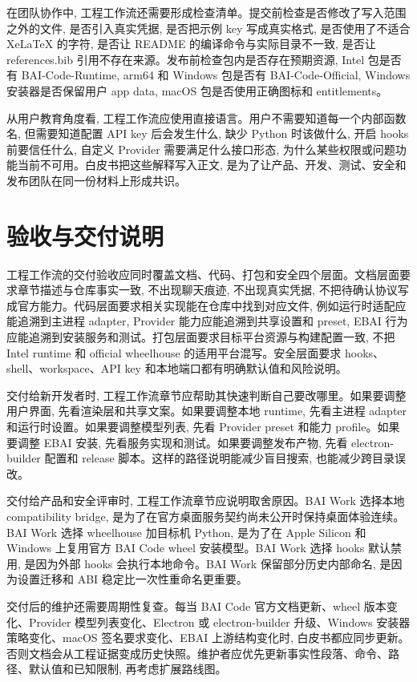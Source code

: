 在团队协作中, 工程工作流还需要形成检查清单。提交前检查是否修改了写入范围之外的文件, 是否引入真实凭据, 是否把示例 key 写成真实格式, 是否使用了不适合 XeLaTeX 的字符, 是否让 README 的编译命令与实际目录不一致, 是否让 references.bib 引用不存在来源。发布前检查包内是否存在预期资源, Intel 包是否有 BAI-Code-Runtime, arm64 和 Windows 包是否有 BAI-Code-Official, Windows 安装器是否保留用户 app data, macOS 包是否使用正确图标和 entitlements。

从用户教育角度看, 工程工作流应使用直接语言。用户不需要知道每一个内部函数名, 但需要知道配置 API key 后会发生什么, 缺少 Python 时该做什么, 开启 hooks 前要信任什么, 自定义 Provider 需要满足什么接口形态, 为什么某些权限或问题功能当前不可用。白皮书把这些解释写入正文, 是为了让产品、开发、测试、安全和发布团队在同一份材料上形成共识。

\section{验收与交付说明}
工程工作流的交付验收应同时覆盖文档、代码、打包和安全四个层面。文档层面要求章节描述与仓库事实一致, 不出现聊天痕迹, 不出现真实凭据, 不把待确认协议写成官方能力。代码层面要求相关实现能在仓库中找到对应文件, 例如运行时适配应能追溯到主进程 adapter, Provider 能力应能追溯到共享设置和 preset, EBAI 行为应能追溯到安装服务和测试。打包层面要求目标平台资源与构建配置一致, 不把 Intel runtime 和 official wheelhouse 的适用平台混写。安全层面要求 hooks、shell、workspace、API key 和本地端口都有明确默认值和风险说明。

交付给新开发者时, 工程工作流章节应帮助其快速判断自己要改哪里。如果要调整用户界面, 先看渲染层和共享文案。如果要调整本地 runtime, 先看主进程 adapter 和运行时设置。如果要调整模型列表, 先看 Provider preset 和能力 profile。如果要调整 EBAI 安装, 先看服务实现和测试。如果要调整发布产物, 先看 electron-builder 配置和 release 脚本。这样的路径说明能减少盲目搜索, 也能减少跨目录误改。

交付给产品和安全评审时, 工程工作流章节应说明取舍原因。BAI Work 选择本地 compatibility bridge, 是为了在官方桌面服务契约尚未公开时保持桌面体验连续。BAI Work 选择 wheelhouse 加目标机 Python, 是为了在 Apple Silicon 和 Windows 上复用官方 BAI Code wheel 安装模型。BAI Work 选择 hooks 默认禁用, 是因为外部 hooks 会执行本地命令。BAI Work 保留部分历史内部命名, 是因为设置迁移和 ABI 稳定比一次性重命名更重要。

交付后的维护还需要周期性复查。每当 BAI Code 官方文档更新、wheel 版本变化、Provider 模型列表变化、Electron 或 electron-builder 升级、Windows 安装器策略变化、macOS 签名要求变化、EBAI 上游结构变化时, 白皮书都应同步更新。否则文档会从工程证据变成历史快照。维护者应优先更新事实性段落、命令、路径、默认值和已知限制, 再考虑扩展路线图。

